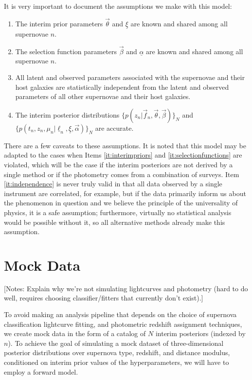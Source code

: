 \documentclass[12pt, onecolumn]{emulateapj}
\newcommand{\textul}{\underline}
\begin{document}
It is very important to document the assumptions we make with this model:
\begin{enumerate}
	\item\label{it:interimpriors} The interim prior parameters $\vec{\theta}$ and $\textul{\xi}$ are known and shared among all supernovae $n$.
	\item\label{it:selectionfunctions} The selection function parameters $\vec{\beta}$ and $\textul{\alpha}$ are known and shared among all supernovae $n$.
	\item\label{it:independence} All latent and observed parameters associated with the supernovae and their host galaxies are statistically independent from the latent and observed parameters of all other supernovae and their host galaxies.
	\item The interim posterior distributions $\{p(z_{n} | \vec{f}_{n}, \vec{\theta}, \vec{\beta})\}_{N}$ and $\{p(t_{n}, z_{n}, \mu_{n} | \textul{\ell}_{n}, \textul{\xi}, \vec{\alpha})\}_{N}$ are accurate.
\end{enumerate}
There are a few caveats to these assumptions.  It is noted that this model may be adapted to the cases when Items \ref{it:interimpriors} and \ref{it:selectionfunctions} are violated, which will be the case if the interim posteriors are not derived by a single method or if the photometry comes from a combination of surveys.  Item \ref{it:independence} is never truly valid in that all data observed by a single instrument are correlated, for example, but if the data primarily inform us about the phenomenon in question and we believe the principle of the universality of physics, it is a safe assumption; furthermore, virtually no statistical analysis would be possible without it, so all alternative methods already make this assumption.



\section{Mock Data}
\label{sec:data}

[Notes: Explain why we're not simulating lightcurves and photometry (hard to do well, requires choosing classifier/fitters that currently don't exist).]

To avoid making an analysis pipeline that depends on the choice of supernova classification lightcurve fitting, and photometric redshift assignment techniques, we create mock data in the form of a catalog of $N$ interim posteriors (indexed by $n$).  To achieve the goal of simulating a mock dataset of three-dimensional posterior distributions over supernova type, redshift, and distance modulus, conditioned on interim prior values of the hyperparameters, we will have to employ a forward model.
\end{document}
